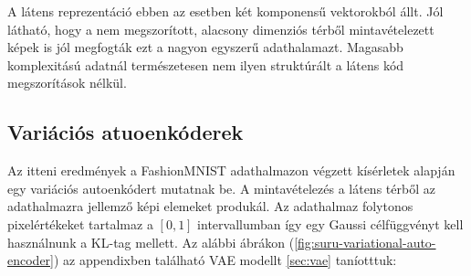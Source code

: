 \documentclass[12pt, english]{article}
\begin{document}
\vspace{4mm}

\par A látens reprezentáció ebben az esetben két komponensű vektorokból állt. Jól látható, hogy a nem megszorított, alacsony dimenziós térből mintavételezett képek is jól megfogták ezt a nagyon egyszerű adathalamazt. Magasabb komplexitású adatnál természetesen nem ilyen struktúrált a látens kód megszorítások nélkül.

\newpage

\subsection{Variációs atuoenkóderek}

\vspace{5mm}

\par Az itteni eredmények a FashionMNIST adathalmazon végzett kísérletek alapján egy variációs autoenkódert mutatnak be. A mintavételezés a látens térből az adathalmazra jellemző képi elemeket produkál. Az adathalmaz folytonos pixelértékeket tartalmaz a $[0, 1]$ intervallumban így egy Gaussi célfüggvényt kell használnunk a KL-tag mellett. Az alábbi ábrákon (\ref{fig:suru-variational-auto-encoder}) az appendixben található VAE modellt \ref{sec:vae} taníotttuk:

\vspace{4mm}
\end{document}
